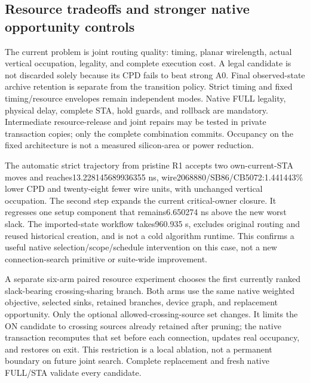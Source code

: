 \subsection{Resource tradeoffs and stronger native opportunity controls}
The current problem is joint routing quality: timing, planar wirelength, actual vertical occupation, legality, and complete execution cost. A legal candidate is not discarded solely because its CPD fails to beat strong A0. Final observed-state archive retention is separate from the transition policy. Strict timing and fixed timing/resource envelopes remain independent modes. Native FULL legality, physical delay, complete STA, hold guards, and rollback are mandatory. Intermediate resource-release and joint repairs may be tested in private transaction copies; only the complete combination commits. Occupancy on the fixed architecture is not a measured silicon-area or power reduction.

The automatic strict trajectory from pristine R1 accepts two own-current-STA moves and reaches13.228145689936355 ns, wire2068880/SB86/CB5072:1.441443\% lower CPD and twenty-eight fewer wire units, with unchanged vertical occupation. The second step expands the current critical-owner closure. It regresses one setup component that remains6.650274 ns above the new worst slack. The imported-state workflow takes960.935 s, excludes original routing and reused historical creation, and is not a cold algorithm runtime. This confirms a useful native selection/scope/schedule intervention on this case, not a new connection-search primitive or suite-wide improvement.

A separate six-arm paired resource experiment chooses the first currently ranked slack-bearing crossing-sharing branch. Both arms use the same native weighted objective, selected sinks, retained branches, device graph, and replacement opportunity. Only the optional allowed-crossing-source set changes. It limits the ON candidate to crossing sources already retained after pruning; the native transaction recomputes that set before each connection, updates real occupancy, and restores on exit. This restriction is a local ablation, not a permanent boundary on future joint search. Complete replacement and fresh native FULL/STA validate every candidate.


